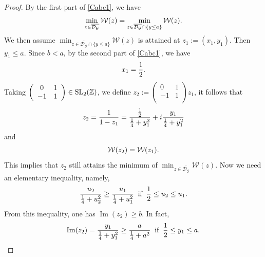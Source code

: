 \documentclass[10pt,a4paper]{amsart}
\renewcommand{\Im}{\operatorname{Im}}
\begin{document}
\begin{proof}
By the first part of \eqref{Cabc1}, we have
\begin{equation}\aligned\nonumber
\min_{z\in\overline{\mathcal{D}_{\mathcal{G}}}}\mathcal{W}(z)=\min_{z\in\overline{\mathcal{D}_{\mathcal{G}}}\cap\{y\leq a\}}\mathcal{W}(z).
\endaligned\end{equation}
We then assume $\min_{z\in\overline{\mathcal{D}_{\mathcal{G}}}\cap\{y\leq a\}}\mathcal{W}(z)$ is attained at $z_1:=(x_1,y_1)$.
Then $y_1\leq a$. Since $b<a$, by the second part of \eqref{Cabc1}, we have
\begin{equation}\aligned\label{xxx}
x_1=\frac{1}{2}.
\endaligned\end{equation}
Taking $\left(
                                                                      \begin{array}{cc}
                                                                        0 & 1 \\
                                                                        -1 & 1 \\
                                                                      \end{array}
                                                                    \right)\in \hbox{SL}_2(\mathbb{Z})$,
                                                                    we define
$z_2:=\left(
                                                                      \begin{array}{cc}
                                                                        0 & 1 \\
                                                                        -1 & 1 \\
                                                                      \end{array}
                                                                    \right)z_1$, it follows that
\begin{equation}\aligned\nonumber
z_2=\frac{1}{1-z_1}=\frac{\frac{1}{2}}{\frac{1}{4}+y_1^2}+i \frac{y_1}{\frac{1}{4}+y_1^2}
 \endaligned\end{equation}
and
 \begin{equation}\aligned\nonumber
\mathcal{W}(z_2)=\mathcal{W}(z_1).
 \endaligned\end{equation}
 This implies that $z_2$ still attains the minimum of $\min_{z\in\overline{\mathcal{D}_{\mathcal{G}}}}\mathcal{W}(z)$.
 Now we need an elementary inequality, namely,
  \begin{equation}\aligned\nonumber
\frac{u_2}{\frac{1}{4}+u_2^2}\geq\frac{u_1}{\frac{1}{4}+u_1^2}\;\;\hbox{if}\;\;\frac{1}{2}\leq u_2\leq u_1.
 \endaligned\end{equation}
 From this inequality, one has $\Im(z_2)\geq b$. In fact,
  \begin{equation}\aligned\nonumber
\Im(z_2)=\frac{y_1}{\frac{1}{4}+y_1^2}\geq\frac{a}{\frac{1}{4}+a^2}\;\;\hbox{if}\;\;\frac{1}{2}\leq y_1\leq a.
 \endaligned\end{equation}



\end{proof}
\end{document}
